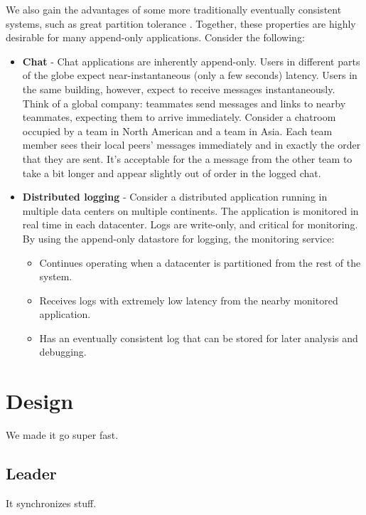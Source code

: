 \documentclass[11pt,english,twocolumn]{article}
\begin{document}
We also gain the advantages of some more traditionally eventually consistent
systems, such as great partition tolerance \cite{dynamo}. Together, these
properties are highly desirable for many append-only applications. Consider the
following:

\begin{itemize}
	\item \textbf{Chat} - Chat applications are inherently append-only. Users
		in different parts of the globe expect near-instantaneous (only
		a few seconds) latency. Users in the same building, however,
		expect to receive messages instantaneously. Think of a global
		company: teammates send messages and links to nearby teammates,
		expecting them to arrive immediately. Consider a chatroom
		occupied by a team in North American and a team in Asia. Each
		team member sees their local peers' messages immediately and in
		exactly the order that they are sent. It's acceptable for the a
		message from the other team to take a bit longer and appear
		slightly out of order in the logged chat.
	\item \textbf{Distributed logging} - Consider a distributed application
		running in multiple data centers on multiple continents. The
		application is monitored in real time in each datacenter. Logs
		are write-only, and critical for monitoring. By using the
		append-only datastore for logging, the monitoring service:
		\begin{itemize}
			\item Continues operating when a datacenter is
				partitioned from the rest of the system.
			\item Receives logs with extremely low latency from the
				nearby monitored application.
			\item Has an eventually consistent log that can be
				stored for later analysis and debugging.
		\end{itemize}
\end{itemize}

\section{Design}
We made it go super fast.

\subsection{Leader}
It synchronizes stuff.
\end{document}
